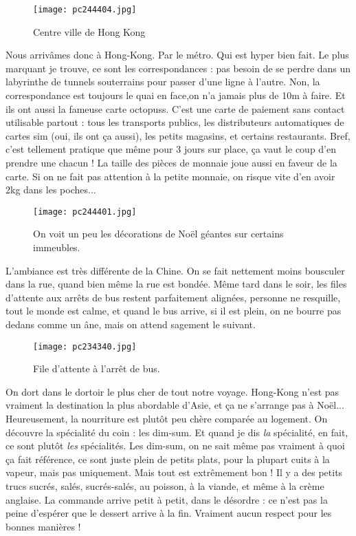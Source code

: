 \documentclass{book}
\begin{document}
\begin{figure}[h]
\centering
\texttt{[image: pc244404.jpg]}
\caption*{Centre ville de Hong Kong}
\end{figure}

Nous arrivâmes donc à Hong-Kong. Par le métro. Qui est hyper bien fait. Le plus marquant je trouve, ce sont les correspondances : pas besoin de se perdre dans un labyrinthe de tunnels souterrains pour passer d'une ligne à l'autre. Non, la correspondance est toujours le quai en face,on n'a jamais plus de 10m à faire. Et ils ont aussi la fameuse carte octopuss. C'est une carte de paiement sans contact utilisable partout : tous les transports publics, les distributeurs automatiques de cartes sim (oui, ils ont ça aussi), les petits magasins, et certains restaurants. Bref, c'est tellement pratique que même pour 3 jours sur place, ça vaut le coup d'en prendre une chacun ! La taille des pièces de monnaie joue aussi en faveur de la carte. Si on ne fait pas attention à la petite monnaie, on risque vite d'en avoir 2kg dans les poches...


\begin{figure}[h]
\centering
\texttt{[image: pc244401.jpg]}
\caption*{On voit un peu les décorations de Noël géantes sur certains immeubles.}
\end{figure}

L'ambiance est très différente de la Chine. On se fait nettement moins bousculer dans la rue, quand bien même la rue est bondée. Même tard dans le soir, les files d'attente aux arrêts de bus restent parfaitement alignées, personne ne resquille, tout le monde est calme, et quand le bus arrive, si il est plein, on ne bourre pas dedans comme un âne, mais on attend sagement le suivant.


\begin{figure}[h]
\centering
\texttt{[image: pc234340.jpg]}
\caption*{File d'attente à l'arrêt de bus.}
\end{figure}

On dort dans le dortoir le plus cher de tout notre voyage. Hong-Kong n'est pas vraiment la destination la plus abordable d'Asie, et ça ne s'arrange pas à Noël... Heureusement, la nourriture est plutôt peu chère comparée au logement. On découvre la spécialité du coin : les dim-sum. Et quand je dis \emph{la} spécialité, en fait, ce sont plutôt \emph{les} spécialités. Les dim-sum, on ne sait même pas vraiment à quoi ça fait référence, ce sont juste plein de petits plats, pour la plupart cuits à la vapeur, mais pas uniquement. Mais tout est extrêmement bon ! Il y a des petits trucs sucrés, salés, sucrés-salés, au poisson, à la viande, et même à la crème anglaise. La commande arrive petit à petit, dans le désordre : ce n'est pas la peine d'espérer que le dessert arrive à la fin. Vraiment aucun respect pour les bonnes manières !
\end{document}
